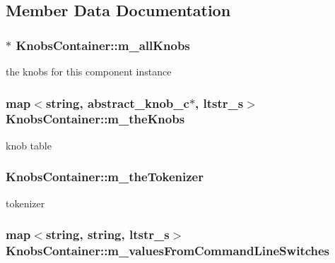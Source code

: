 \subsection{Member Data Documentation}
\hypertarget{classKnobsContainer_a91c5f9c036624bf76d18407e8deaf6df}{
\subsubsection[{m\_\-allKnobs}]{$\ast$ {\bf KnobsContainer::m\_\-allKnobs}}}
\label{classKnobsContainer_a91c5f9c036624bf76d18407e8deaf6df}
the knobs for this component instance \hypertarget{classKnobsContainer_aab767049ce233f64dc20d038a032555e}{
\subsubsection[{m\_\-theKnobs}]{\setlength{\rightskip}{0pt plus 5cm}map$<$string, {\bf abstract\_\-knob\_\-c}$\ast$, {\bf ltstr\_\-s}$>$ {\bf KnobsContainer::m\_\-theKnobs}}}
\label{classKnobsContainer_aab767049ce233f64dc20d038a032555e}
knob table \hypertarget{classKnobsContainer_add2e416036701c2de00e519c9552886d}{
\subsubsection[{m\_\-theTokenizer}]{ {\bf KnobsContainer::m\_\-theTokenizer}}}
\label{classKnobsContainer_add2e416036701c2de00e519c9552886d}
tokenizer \hypertarget{classKnobsContainer_acf9676b119cffbfdff8e7dfdd4d05f06}{
\subsubsection[{m\_\-valuesFromCommandLineSwitches}]{\setlength{\rightskip}{0pt plus 5cm}map$<$string, string, {\bf ltstr\_\-s}$>$ {\bf KnobsContainer::m\_\-valuesFromCommandLineSwitches}}}
